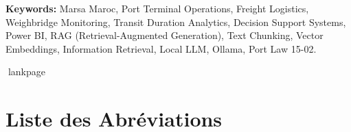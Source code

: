 \documentclass[12pt,a4paper,oneside]{report}
\newcommand{\blankpage}{%
  \newpage
  \thispagestyle{empty}%
  \mbox{}%
  \newpage
}
\begin{document}
\textbf{Keywords:} Marsa Maroc, Port Terminal Operations, Freight Logistics, Weighbridge Monitoring, Transit Duration Analytics, Decision Support Systems, Power BI, RAG (Retrieval-Augmented Generation), Text Chunking, Vector Embeddings, Information Retrieval, Local LLM, Ollama, Port Law 15-02.

\newpage

lankpage
\blankpage

\tableofcontents
\newpage
\listoffigures
\listoftables
\newpage

\blankpage

\chapter*{Liste des Abréviations}
\end{document}
